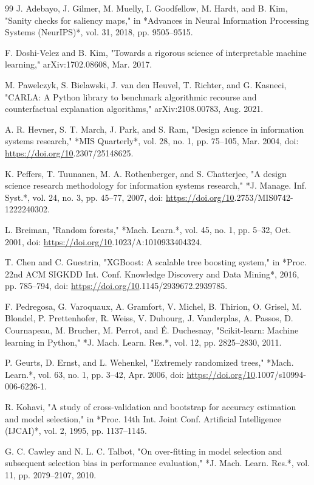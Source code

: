 \begin{thebibliography}{99}
 J. Adebayo, J. Gilmer, M. Muelly, I. Goodfellow, M. Hardt, and B. Kim, "Sanity checks for saliency maps," in *Advances in Neural Information Processing Systems (NeurIPS)*, vol. 31, 2018, pp. 9505–9515.

 F. Doshi-Velez and B. Kim, "Towards a rigorous science of interpretable machine learning," arXiv:1702.08608, Mar. 2017.

 M. Pawelczyk, S. Bielawski, J. van den Heuvel, T. Richter, and G. Kasneci, "CARLA: A Python library to benchmark algorithmic recourse and counterfactual explanation algorithms," arXiv:2108.00783, Aug. 2021.

 A. R. Hevner, S. T. March, J. Park, and S. Ram, "Design science in information systems research," *MIS Quarterly*, vol. 28, no. 1, pp. 75–105, Mar. 2004, doi: \url{https://doi.org/10}.2307/25148625.

 K. Peffers, T. Tuunanen, M. A. Rothenberger, and S. Chatterjee, "A design science research methodology for information systems research," *J. Manage. Inf. Syst.*, vol. 24, no. 3, pp. 45–77, 2007, doi: \url{https://doi.org/10}.2753/MIS0742-1222240302.

 L. Breiman, "Random forests," *Mach. Learn.*, vol. 45, no. 1, pp. 5–32, Oct. 2001, doi: \url{https://doi.org/10}.1023/A:1010933404324.

 T. Chen and C. Guestrin, "XGBoost: A scalable tree boosting system," in *Proc. 22nd ACM SIGKDD Int. Conf. Knowledge Discovery and Data Mining*, 2016, pp. 785–794, doi: \url{https://doi.org/10}.1145/2939672.2939785.

 F. Pedregosa, G. Varoquaux, A. Gramfort, V. Michel, B. Thirion, O. Grisel, M. Blondel, P. Prettenhofer, R. Weiss, V. Dubourg, J. Vanderplas, A. Passos, D. Cournapeau, M. Brucher, M. Perrot, and É. Duchesnay, "Scikit-learn: Machine learning in Python," *J. Mach. Learn. Res.*, vol. 12, pp. 2825–2830, 2011.

 P. Geurts, D. Ernst, and L. Wehenkel, "Extremely randomized trees," *Mach. Learn.*, vol. 63, no. 1, pp. 3–42, Apr. 2006, doi: \url{https://doi.org/10}.1007/s10994-006-6226-1.

 R. Kohavi, "A study of cross-validation and bootstrap for accuracy estimation and model selection," in *Proc. 14th Int. Joint Conf. Artificial Intelligence (IJCAI)*, vol. 2, 1995, pp. 1137–1145.

 G. C. Cawley and N. L. C. Talbot, "On over-fitting in model selection and subsequent selection bias in performance evaluation," *J. Mach. Learn. Res.*, vol. 11, pp. 2079–2107, 2010.


\end{thebibliography}
